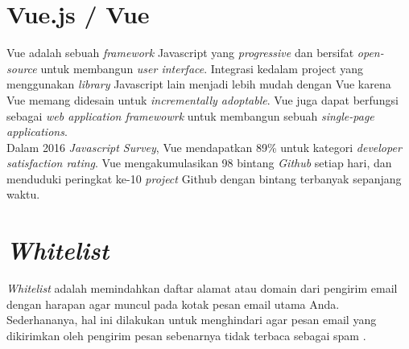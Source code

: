 	\section{  Vue.js / Vue}
	  Vue adalah sebuah \textit{framework} Javascript yang \textit{progressive} dan bersifat \textit{open-source} untuk membangun \textit{user interface}. Integrasi kedalam project yang menggunakan \textit{library } Javascript lain menjadi lebih mudah dengan Vue karena Vue memang didesain untuk \textit{incrementally adoptable}. Vue juga dapat berfungsi sebagai \textit{web application framewowrk} untuk membangun sebuah \textit{single-page applications}.
	  \\ \indent
	  Dalam 2016 \textit{Javascript Survey}, Vue mendapatkan 89\% untuk kategori \textit{developer satisfaction rating}. Vue mengakumulasikan 98 bintang \textit{Github} setiap hari, dan menduduki peringkat ke-10 \textit{project} Github dengan bintang terbanyak sepanjang waktu\cite{wikipedia_vue.js_2017}.
	
	\section{ \textit{Whitelist}}
	\textit{Whitelist} adalah memindahkan daftar alamat atau domain dari pengirim email dengan harapan agar muncul pada kotak pesan email utama Anda. Sederhananya, hal ini dilakukan untuk menghindari agar pesan email yang dikirimkan oleh pengirim pesan sebenarnya tidak terbaca sebagai spam \cite{wikipedia_sendgrid_2017}.
